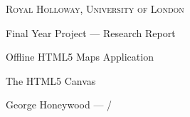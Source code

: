 


{
\centering
{\scshape\large Royal Holloway, University of London\par}
\vspace{0.5cm}
{\Huge Final Year Project --- Research Report\par}
\vspace{0.2cm}
{\Large Offline HTML5 Maps Application\par}
\vspace{0.2cm}
{\Huge The HTML5 Canvas\par}
\vspace{0.5cm}
{\large George Honeywood --- \the\month/\the\year\par}
\vspace{0.5cm}
}



\printbibliography{}


